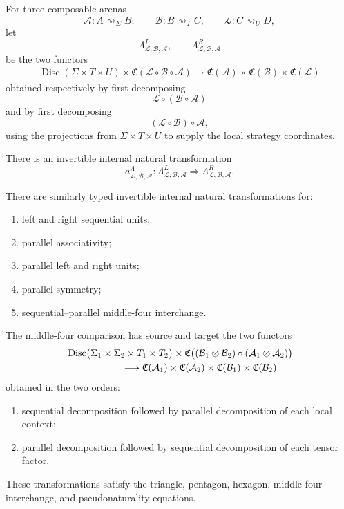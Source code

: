 \begin{definition}
For three composable arenas
\[
  \mathcal A:A\rightsquigarrow_\Sigma B,
  \qquad
  \mathcal B:B\rightsquigarrow_T C,
  \qquad
  \mathcal L:C\rightsquigarrow_U D,
\]
let
\[
  \Lambda^{L}_{\mathcal L,\mathcal B,\mathcal A},
  \qquad
  \Lambda^{R}_{\mathcal L,\mathcal B,\mathcal A}
\]
be the two functors
\[
\begin{aligned}
  \operatorname{Disc}(\Sigma\times T\times U)
  \times
  \mathfrak C(\mathcal L\circ\mathcal B\circ\mathcal A)
  \longrightarrow
  \mathfrak C(\mathcal A)
  \times
  \mathfrak C(\mathcal B)
  \times
  \mathfrak C(\mathcal L)
\end{aligned}
\]
obtained respectively by first decomposing
\[
  \mathcal L\circ(\mathcal B\circ\mathcal A)
\]
and by first decomposing
\[
  (\mathcal L\circ\mathcal B)\circ\mathcal A,
\]
using the projections from \(\Sigma\times T\times U\) to supply the local strategy coordinates.

There is an invertible internal natural transformation
\[
  a^{\Lambda}_{\mathcal L,\mathcal B,\mathcal A}:
  \Lambda^{L}_{\mathcal L,\mathcal B,\mathcal A}
  \Longrightarrow
  \Lambda^{R}_{\mathcal L,\mathcal B,\mathcal A}.
\]

There are similarly typed invertible internal natural transformations for:

\begin{enumerate}
  \item left and right sequential units;
  \item parallel associativity;
  \item parallel left and right units;
  \item parallel symmetry;
  \item sequential--parallel middle-four interchange.
\end{enumerate}

The middle-four comparison has source and target the two functors
\[
\begin{aligned}
&
\operatorname{Disc}
\bigl(
  \Sigma_1\times\Sigma_2\times T_1\times T_2
\bigr)
\times
\mathfrak C
\bigl(
  (\mathcal B_1\otimes\mathcal B_2)
  \circ
  (\mathcal A_1\otimes\mathcal A_2)
\bigr)
\\
&\hspace{20mm}\longrightarrow
\mathfrak C(\mathcal A_1)
\times
\mathfrak C(\mathcal A_2)
\times
\mathfrak C(\mathcal B_1)
\times
\mathfrak C(\mathcal B_2)
\end{aligned}
\]
obtained in the two orders:

\begin{enumerate}
  \item sequential decomposition followed by parallel decomposition of each local context;
  \item parallel decomposition followed by sequential decomposition of each tensor factor.
\end{enumerate}

These transformations satisfy the triangle, pentagon, hexagon, middle-four interchange, and
pseudonaturality equations.
\end{definition}

